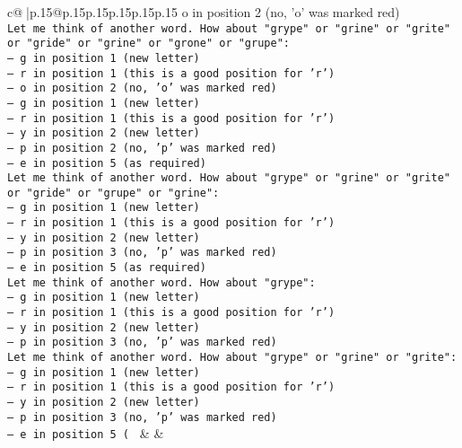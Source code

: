 \documentclass{article}
\begin{document}
{\begin{supertabular}{c@{$\;$}|p{.15\linewidth}@{}p{.15\linewidth}p{.15\linewidth}p{.15\linewidth}p{.15\linewidth}p{.15\linewidth}}
{{{o in position 2 (no, 'o' was marked red)\\ \tt Let me think of another word. How about "grype" or "grine" or "grite" or "gride" or "grine" or "grone" or "grupe": \\ \tt — g in position 1 (new letter)\\ \tt — r in position 1 (this is a good position for 'r')\\ \tt — o in position 2 (no, 'o' was marked red)\\ \tt — g in position 1 (new letter)\\ \tt — r in position 1 (this is a good position for 'r')\\ \tt — y in position 2 (new letter)\\ \tt — p in position 2 (no, 'p' was marked red)\\ \tt — e in position 5 (as required)\\ \tt Let me think of another word. How about "grype" or "grine" or "grite" or "gride" or "grupe" or "grine": \\ \tt — g in position 1 (new letter)\\ \tt — r in position 1 (this is a good position for 'r')\\ \tt — y in position 2 (new letter)\\ \tt — p in position 3 (no, 'p' was marked red)\\ \tt — e in position 5 (as required)\\ \tt Let me think of another word. How about "grype": \\ \tt — g in position 1 (new letter)\\ \tt — r in position 1 (this is a good position for 'r')\\ \tt — y in position 2 (new letter)\\ \tt — p in position 3 (no, 'p' was marked red)\\ \tt Let me think of another word. How about "grype" or "grine" or "grite": \\ \tt — g in position 1 (new letter)\\ \tt — r in position 1 (this is a good position for 'r')\\ \tt — y in position 2 (new letter)\\ \tt — p in position 3 (no, 'p' was marked red)\\ \tt — e in position 5 ( 
	  } 
	   } 
	   } 
	 & & \\ 
 

    \theutterance {}  


\end{supertabular}}
\end{document}
